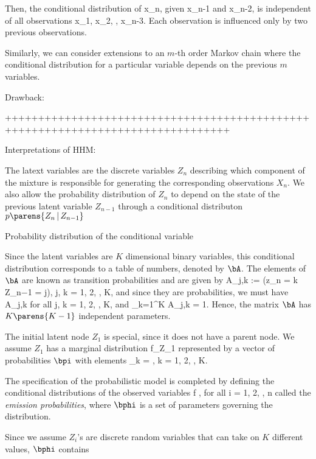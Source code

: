 Then, the conditional distribution of x_n, given x_{n-1} and x_{n-2}, is independent of all observations x_1, x_2, \cdots, x_{n-3}.
Each observation is influenced only by two previous observations.

Similarly, we can consider extensions to an $m$-th order Markov chain where the conditional distribution for a particular variable depends on the previous $m$ variables.

Drawback:



++++++++++++++++++++++++++++++++++++++++++++++++++++++++++++++++++++++++++++++++

\item Interpretations of HHM:


\item The latext variables are the discrete variables $Z_n$ describing which component of the mixture is responsible for generating the corresponding observations $X_n$.
We also allow the probability distribution of $Z_n$ to depend on the state of the previous latent variable $Z_{n-1}$ through a conditional distributon $p \parens{Z_n \,\vert\, Z_{n-1}}$


Probability distribution of the conditional variable

Since the latent variables are $K$ dimensional binary variables, this conditional distribution
corresponds to a table of numbers, denoted by $\bA$. The elements of $\bA$ are known as transition
probabilities and are given by
A_{j,k} := \Pr (z_{n} = k \,\vert\, Z_{n−1} = j), \qquad {} j, k = 1, 2, \cdots, K,
and since they are probabilities, we must have
A_{j,k} \in {} for all j, k = 1, 2, \cdots, K,
and
\sum_{k=1}^K A_{j,k} = 1.
Hence, the matrix $\bA$ has $K \parens{K-1}$ independent parameters.

The initial latent node $Z_1$ is special, since it does not have a parent node. We assume $Z_1$ has a
marginal distribution f_{Z_1} represented by a vector of probabilities $\bpi$ with elements
\pi_k = \Pr {}, \qquad {} k = 1, 2, \cdots, K.

The specification of the probabilistic model is completed by defining the conditional distributions of the observed variables
f , for all i = 1, 2, \cdots, n
called the \emph{emission probabilities}, where $\bphi$ is a set of parameters governing the distribution.

Since we assume $Z_i$'s are discrete random variables that can take on $K$ different values, $\bphi$ contains








